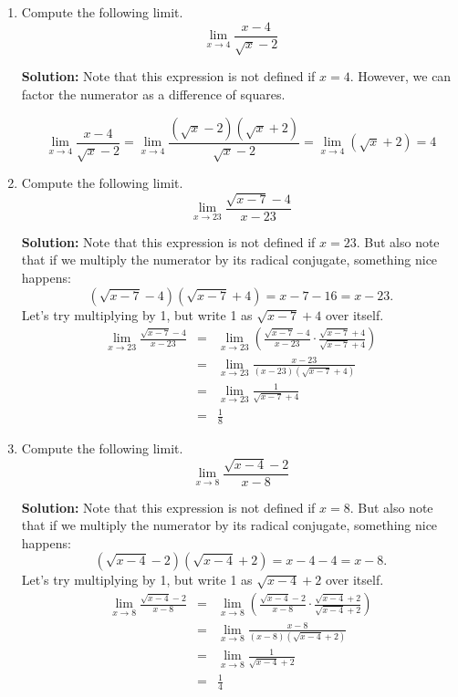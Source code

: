 \documentclass{article}
\begin{document}
\begin{enumerate}
  
\vspace{1cm}

\item Compute the following limit. \[ \lim_{x \rightarrow 4} \frac{x - 4}{\sqrt{x} - 2} \]

\textbf{Solution:} Note that this expression is not defined if $x = 4$. However, we can factor the numerator as a difference of squares.

\[ \lim_{x \rightarrow 4} \frac{x - 4}{\sqrt{x} - 2} = \lim_{x \rightarrow 4} \frac{(\sqrt{x} - 2)(\sqrt{x} + 2)}{\sqrt{x} - 2} = \lim_{x \rightarrow 4} (\sqrt{x} + 2) = 4 \]


  
\vspace{1cm}

\item Compute the following limit. \[ \lim_{x \rightarrow 23} \frac{\sqrt{x - 7} - 4}{x - 23} \]

\textbf{Solution:} Note that this expression is not defined if $x = 23$. But also note that if we multiply the numerator by its radical conjugate, something nice happens:
\[ \left(\sqrt{x - 7} - 4\right)\left(\sqrt{x - 7} + 4\right) = x - 7 - 16 = x - 23. \]
Let's try multiplying by 1, but write 1 as $\sqrt{x - 7} + 4$ over itself.
\begin{eqnarray*}
\lim_{x \rightarrow 23} \frac{\sqrt{x - 7} - 4}{x - 23} & = & \lim_{x \rightarrow 23} \left( \frac{\sqrt{x - 7} - 4}{x - 23} \cdot \frac{\sqrt{x - 7} + 4}{\sqrt{x - 7} + 4} \right) \\
 & = & \lim_{x \rightarrow 23} \frac{x - 23}{(x - 23)(\sqrt{x - 7} + 4)} \\
 & = & \lim_{x \rightarrow 23} \frac{1}{\sqrt{x - 7} + 4} \\
 & = & \frac{1}{8}
\end{eqnarray*}


  
\vspace{1cm}

\item Compute the following limit. \[ \lim_{x \rightarrow 8} \frac{\sqrt{x - 4} - 2}{x - 8} \]

\textbf{Solution:} Note that this expression is not defined if $x = 8$. But also note that if we multiply the numerator by its radical conjugate, something nice happens:
\[ \left(\sqrt{x - 4} - 2\right)\left(\sqrt{x - 4} + 2\right) = x - 4 - 4 = x - 8. \]
Let's try multiplying by 1, but write 1 as $\sqrt{x - 4} + 2$ over itself.
\begin{eqnarray*}
\lim_{x \rightarrow 8} \frac{\sqrt{x - 4} - 2}{x - 8} & = & \lim_{x \rightarrow 8} \left( \frac{\sqrt{x - 4} - 2}{x - 8} \cdot \frac{\sqrt{x - 4} + 2}{\sqrt{x - 4} + 2} \right) \\
 & = & \lim_{x \rightarrow 8} \frac{x - 8}{(x - 8)(\sqrt{x - 4} + 2)} \\
 & = & \lim_{x \rightarrow 8} \frac{1}{\sqrt{x - 4} + 2} \\
 & = & \frac{1}{4}
\end{eqnarray*}



\end{enumerate}
\end{document}
